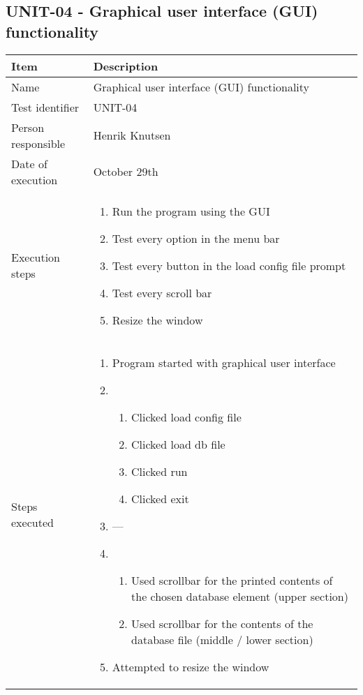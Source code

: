 \documentclass[a4paper]{article}
\begin{document}
\subsection{UNIT-04 - Graphical user interface (GUI) functionality}
		\begin{center}
		\begin{tabular}{ |  p{3cm} | p{7cm} | }
			\hline
			Item & Description \\ [5pt] \hline \hline
			Name & Graphical user interface (GUI) functionality \\  [5pt] \hline
			Test identifier & UNIT-04 \\  [5pt] \hline
			Person responsible & Henrik Knutsen \\  [5pt] \hline
			Date of execution & October 29th \\  [5pt] \hline

			Execution steps & 	\begin{enumerate}
							\item Run the program using the GUI
							\item Test every option in the menu bar
							\item Test every button in the load config file prompt
							\item Test every scroll bar
							\item Resize the window
						\end{enumerate} \\ [5pt] \hline

			Steps executed & 	\begin{enumerate}
							\item Program started with graphical user interface
							\item  
							\begin{enumerate}
								\item Clicked load config file
								\item Clicked load db file
								\item Clicked run
								\item Clicked exit
							\end{enumerate}
							\item ---
							\item 
							\begin{enumerate}
								\item Used scrollbar for the printed contents of the chosen database element (upper section)
								\item Used scrollbar for the contents of the database file (middle / lower section)
							\end{enumerate}
							\item Attempted to resize the window
						\end{enumerate} \\ [5pt] \hline
			

\end{tabular}
\end{center}
\end{document}
